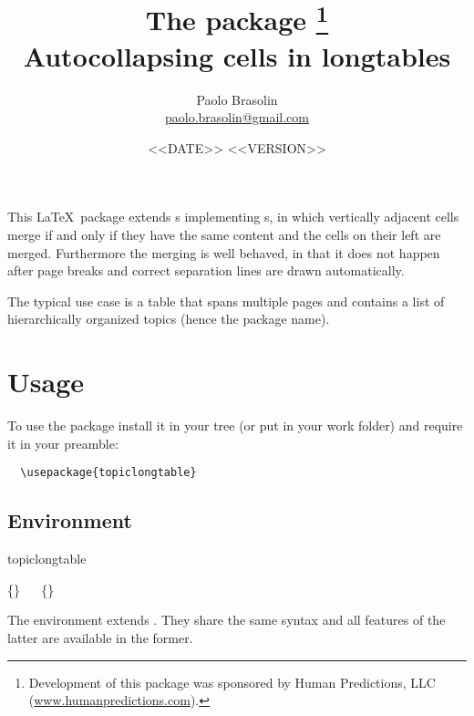 \documentclass[full,kernel]{l3doc}
\begin{document}
\title{%
  The  package%
  \thanks{Development of this package was sponsored by Human Predictions,
    LLC (\href{http://www.humanpredictions.com}{www.humanpredictions.com}).}\\
  Autocollapsing cells in longtables
}

\author{
  Paolo Brasolin\\
  \href{mailto:paolo.brasolin@gmail.com}{paolo.brasolin@gmail.com}
}

\date{<<DATE>> <<VERSION>>}

\maketitle

\begin{documentation}


This \LaTeX\ package extends s implementing
s, in which vertically adjacent cells merge if
and only if they have the same content and the cells on their left
are merged.  Furthermore the merging is well behaved, in that it
does not happen after page breaks and correct separation lines are
drawn automatically.

The typical use case is a table that spans multiple pages and
contains a list of hierarchically organized topics (hence the package
name).




\section*{Usage}

To use the package install it in your tree (or put  in your work folder) and require it in your preamble:

\begin{verbatim}
  \usepackage{topiclongtable}
\end{verbatim}




\subsection*{Environment}

\begin{function}[updated=2019-07-08]{topiclongtable}
  \begin{syntax}
    \{\}
    \ \ 
    \{\}
  \end{syntax}
  The  environment extends .
  They share the same syntax and all features of the latter are
  available in the former.


\end{function}
\end{documentation}
\end{document}
